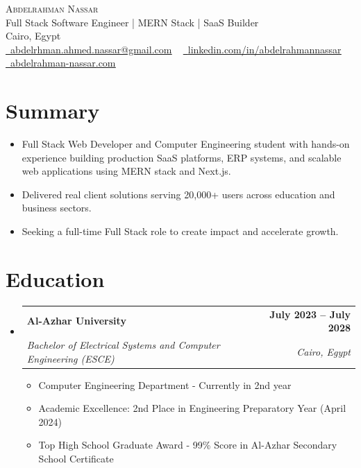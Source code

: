 \documentclass[letterpaper,11pt]{article}
\makeatletter
\newcommand{\resumeItem}[1]{
  \item\small{
    {#1 \vspace{-2pt}}
  }
}
\newcommand{\resumeSubheading}[4]{
  \vspace{-2pt}\item
    \begin{tabular*}{1.0\textwidth}[t]{l@{\extracolsep{\fill}}r}
      \textbf{#1} & \textbf{\small #2} \\
      \textit{\small#3} & \textit{\small #4} \\
    \end{tabular*}\vspace{-7pt}
}
\newcommand{\resumeSubHeadingListStart}{\begin{itemize}[leftmargin=0.0in, label={}]}
\newcommand{\resumeSubHeadingListEnd}{\end{itemize}}
\newcommand{\resumeItemListStart}{\begin{itemize}}
\newcommand{\resumeItemListEnd}{\end{itemize}\vspace{-5pt}}
\makeatother
\begin{document}
\begin{center}
    {\Huge \scshape Abdelrahman Nassar} \\ \vspace{5pt}
    Full Stack Software Engineer | MERN Stack | SaaS Builder \\ \vspace{5pt}
    Cairo, Egypt \\ \vspace{5pt}
    \small
    \href{mailto:abdelrhman.ahmed.nassar@gmail.com}{\raisebox{-0.2\height}\faEnvelope\  \underline{abdelrhman.ahmed.nassar@gmail.com}} ~ 
    \href{https://www.linkedin.com/in/abdelrahmannassar}{\raisebox{-0.2\height}\faLinkedin\ \underline{linkedin.com/in/abdelrahmannassar}}  ~
    \href{https://abdelrahman-nassar.com}{\raisebox{-0.2\height}\faGlobe\ \underline{abdelrahman-nassar.com}}
    \vspace{-8pt}
\end{center}

\section{Summary}
\vspace{-3pt}
\resumeSubHeadingListStart
  \resumeItem{Full Stack Web Developer and Computer Engineering student with hands-on experience building production SaaS platforms, ERP systems, and scalable web applications using MERN stack and Next.js.}
  \resumeItem{Delivered real client solutions serving 20,000+ users across education and business sectors.}
  \resumeItem{Seeking a full-time Full Stack role to create impact and accelerate growth.}
\resumeSubHeadingListEnd
\vspace{-10pt}


\section{Education}
  \resumeSubHeadingListStart
    \resumeSubheading
      {Al-Azhar University}{July 2023 -- July 2028}
      {Bachelor of Electrical Systems and Computer Engineering (ESCE)}{Cairo, Egypt}
      \resumeItemListStart
        \resumeItem{Computer Engineering Department - Currently in 2nd year}
        \resumeItem{Academic Excellence: 2nd Place in Engineering Preparatory Year (April 2024)}
        \resumeItem{Top High School Graduate Award - 99\% Score in Al-Azhar Secondary School Certificate}
      \resumeItemListEnd
  \resumeSubHeadingListEnd
\end{document}

